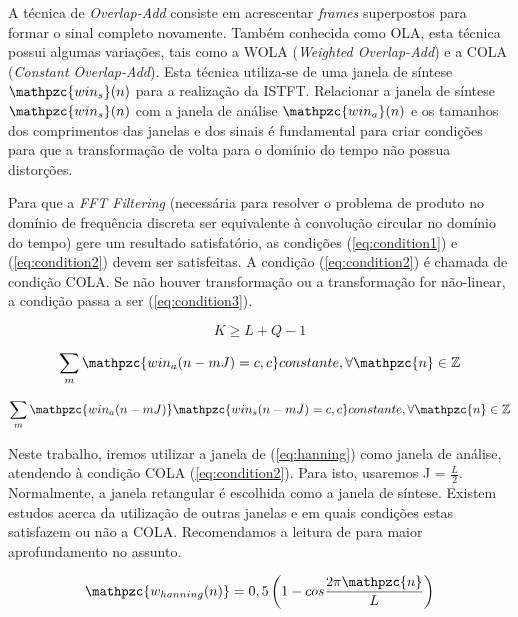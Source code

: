         A técnica de \textit{Overlap-Add} consiste em acrescentar \textit{frames} superpostos para formar o sinal completo novamente. Também conhecida como OLA, esta técnica possui algumas variações, tais como a WOLA (\textit{Weighted Overlap-Add}) e a COLA (\textit{Constant Overlap-Add}). Esta técnica utiliza-se de uma janela de síntese $\mathpzc{win_s}(n)$ para a realização da ISTFT. Relacionar a janela de síntese $\mathpzc{win_s}(n)$ com a janela de análise $\mathpzc{win_a}(n)$ e os tamanhos dos comprimentos das janelas e dos sinais é fundamental para criar condições para que a transformação de volta para o domínio do tempo não possua distorções. 
        
        Para que a \textit{FFT Filtering} (necessária para resolver o problema de produto no domínio de  frequência discreta ser equivalente à convolução circular no domínio do tempo) gere um resultado satisfatório, as condições (\ref{eq:condition1}) e (\ref{eq:condition2}) devem ser satisfeitas. A condição (\ref{eq:condition2}) é chamada de condição COLA. Se não houver transformação ou a transformação for não-linear, a condição passa a ser (\ref{eq:condition3}). 
        
        \begin{equation}\label{eq:condition1}
            K \geq L + Q - 1
        \end{equation}
        
        \begin{equation}\label{eq:condition2}
            \sum_m \mathpzc{win_a(n - mJ) = c , c} constante, \forall\mathpzc{n} \in \mathbb{Z}
        \end{equation}
        
        \begin{equation}\label{eq:condition3}
            \sum_m \mathpzc{win_a(n - mJ)}\mathpzc{win_s(n - mJ) = c , c} constante, \forall\mathpzc{n} \in \mathbb{Z}
        \end{equation}
        
        
        Neste trabalho, iremos utilizar a janela de  (\ref{eq:hanning}) como janela de análise, atendendo à condição COLA (\ref{eq:condition2}). Para isto, usaremos J = $\frac{L}{2}$. Normalmente, a janela retangular é escolhida como a janela de síntese. Existem estudos acerca da utilização de outras janelas e em quais condições estas satisfazem ou não a COLA. Recomendamos a leitura de \cite{LuizVictorio} para maior aprofundamento no assunto.
        
        \begin{equation}\label{eq:hanning}
            \mathpzc{w_{hanning}(n)} = 0,5 \left( 1 - cos\frac{2\pi\mathpzc{n}}{L}\right)
        \end{equation}
        
